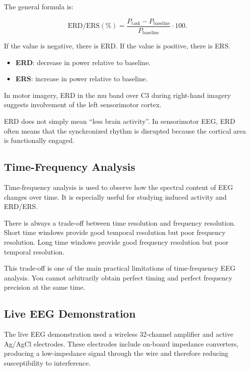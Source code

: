 The general formula is:

\[
\text{ERD/ERS}(\%) =
\frac{P_{\text{task}} - P_{\text{baseline}}}
{P_{\text{baseline}}}
\cdot 100.
\]

If the value is negative, there is ERD. If the value is positive, there is ERS.

\begin{itemize}[noitemsep]
    \item \textbf{ERD}: decrease in power relative to baseline.
    \item \textbf{ERS}: increase in power relative to baseline.
\end{itemize}

In motor imagery, ERD in the mu band over C3 during right-hand imagery suggests involvement of the left sensorimotor cortex.

\begin{authornote}
ERD does not simply mean ``less brain activity''. In sensorimotor EEG, ERD often means that the synchronized rhythm is disrupted because the cortical area is functionally engaged.
\end{authornote}

\subsection{Time-Frequency Analysis}

Time-frequency analysis is used to observe how the spectral content of EEG changes over time. It is especially useful for studying induced activity and ERD/ERS.

There is always a trade-off between time resolution and frequency resolution. Short time windows provide good temporal resolution but poor frequency resolution. Long time windows provide good frequency resolution but poor temporal resolution.

\begin{authornote}
This trade-off is one of the main practical limitations of time-frequency EEG analysis. You cannot arbitrarily obtain perfect timing and perfect frequency precision at the same time.
\end{authornote}

\subsection{Live EEG Demonstration}

The live EEG demonstration used a wireless 32-channel amplifier and active Ag/AgCl electrodes. These electrodes include on-board impedance converters, producing a low-impedance signal through the wire and therefore reducing susceptibility to interference.

